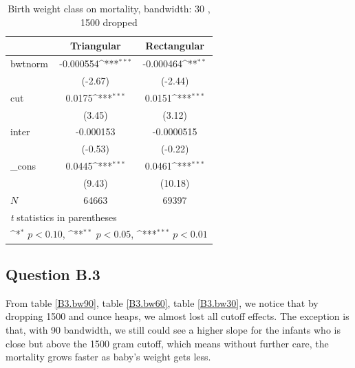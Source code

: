 \documentclass[a4paper,11pt]{article}
\begin{document}
\begin{table}[htbp]\centering
\def\sym#1{\ifmmode^{#1}\else\(^{#1}\)\fi}
\caption{Birth weight class on mortality, bandwidth: 30 , 1500 dropped}
\label{B2.bw30}
\begin{tabular}{l*{2}{c}}
\hline\hline
            &\multicolumn{1}{c}{Triangular}&\multicolumn{1}{c}{Rectangular}\\
\hline
bwtnorm     &   -0.000554\sym{***}&   -0.000464\sym{**} \\
            &     (-2.67)         &     (-2.44)         \\
[1em]
cut         &      0.0175\sym{***}&      0.0151\sym{***}\\
            &      (3.45)         &      (3.12)         \\
[1em]
inter       &   -0.000153         &  -0.0000515         \\
            &     (-0.53)         &     (-0.22)         \\
[1em]
\_cons      &      0.0445\sym{***}&      0.0461\sym{***}\\
            &      (9.43)         &     (10.18)         \\
\hline
\(N\)       &       64663         &       69397         \\
\hline\hline
\multicolumn{3}{l}{\footnotesize \textit{t} statistics in parentheses}\\
\multicolumn{3}{l}{\footnotesize \sym{*} \(p<0.10\), \sym{**} \(p<0.05\), \sym{***} \(p<0.01\)}\\
\end{tabular}
\end{table}

\subsection*{Question B.3}

From table \ref{B3.bw90}, table \ref{B3.bw60}, table \ref{B3.bw30}, we notice that by dropping 1500 and ounce heaps, we almost lost all cutoff effects. The exception is that, with 90 bandwidth, we still could see a higher slope for the infants who is close but above the 1500 gram cutoff, which means without further care, the mortality grows faster as baby's weight gets less.

\end{document}
